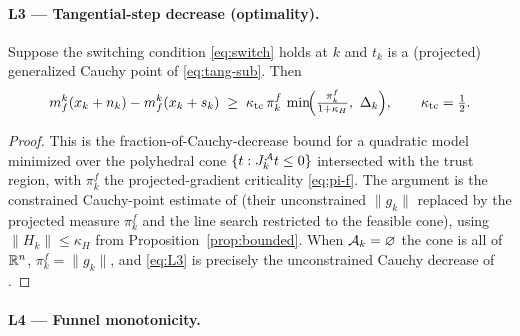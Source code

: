 \paragraph{L3 --- Tangential-step decrease (optimality).}

\begin{lemma}[L3]
  \label{lem:L3}
  Suppose the switching condition \eqref{eq:switch} holds at $k$ and $t_k$ is a
  (projected) generalized Cauchy point of \eqref{eq:tang-sub}. Then
  \begin{equation}
    \label{eq:L3}
    m_f^k(x_k+n_k) - m_f^k(x_k+s_k)
      \;\ge\; \kappa_{\mathrm{tc}}\,\pi_k^f\,
              \min\!\Bigl(\tfrac{\pi_k^f}{1+\kappa_H},\ \Delta_k\Bigr),
    \qquad \kappa_{\mathrm{tc}}=\tfrac12 .
  \end{equation}
\end{lemma}
\begin{proof}
  This is the fraction-of-Cauchy-decrease bound for a quadratic model minimized
  over the polyhedral cone $\{t:J_k^{\mathcal{A}}t\le0\}$ intersected with the trust region,
  with $\pi_k^f$ the projected-gradient criticality \eqref{eq:pi-f}. The argument is
  the constrained Cauchy-point estimate of \citet[Ch.~10]{CSV2009} (their
  unconstrained $\|g_k\|$ replaced by the projected measure $\pi_k^f$ and the line
  search restricted to the feasible cone), using $\|H_k\|\le\kappa_H$ from
  Proposition~\ref{prop:bounded}. When $\mathcal{A}_k=\varnothing$ the cone is all of $\mathbb{R}^{n}$,
  $\pi_k^f=\|g_k\|$, and \eqref{eq:L3} is precisely the unconstrained Cauchy decrease
  of .
\end{proof}

\paragraph{L4 --- Funnel monotonicity.}

